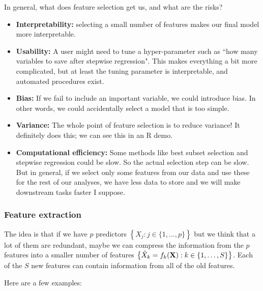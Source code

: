 In general, what does feature selection get us, and what are the risks? 
\begin{itemize}
\item \textbf{Interpretability:} selecting a small number of features makes our final model more interpretable. 
\item \textbf{Usability:} A user might need to tune a hyper-parameter such as ``how many variables to save after stepwise regression". This makes everything a bit more complicated, but at least the tuning parameter is interpretable, and automated procedures exist. 
\item \textbf{Bias:} If we fail to include an important variable, we could introduce bias. In other words, we could accidentally select a model that is too simple. 
\item \textbf{Variance:} The whole point of feature selection is to reduce variance! It definitely does this; we can see this in an R demo.
\item \textbf{Computational efficiency:} Some methods like best subset selection and stepwise regression could be slow. So the actual selection step can be slow. But in general, if we select only some features from our data and use these for the rest of our analyses, we have less data to store and we will make downstream tasks faster I suppose. 
\end{itemize}


\subsubsection{Feature extraction}

The idea is that if we have $p$ predictors $\left\{X_j : j \in \{1,\ldots,p\}\right\}$ but we think that a lot of them are redundant, maybe we can compress the information from the $p$ features into a smaller number of features $\left\{ \tilde{X}_k = f_k(\bold{X}) : k \in \{1,\ldots, S\} \right\}$. Each of the $S$ new features can contain information from all of the old features.  

Here are a few examples:


